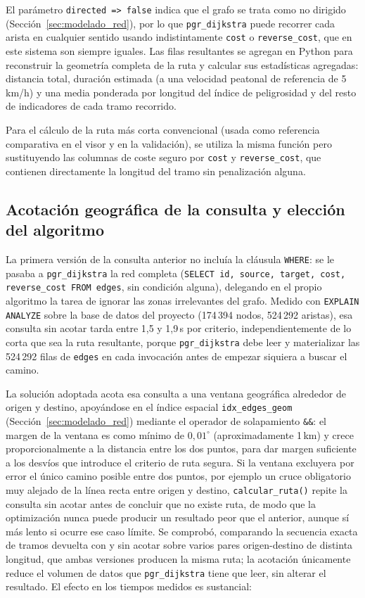 El parámetro \texttt{directed => false} indica que el grafo se trata como no dirigido (Sección~\ref{sec:modelado_red}), por lo que \texttt{pgr\_dijkstra} puede recorrer cada arista en cualquier sentido usando indistintamente \texttt{cost} o \texttt{reverse\_cost}, que en este sistema son siempre iguales. Las filas resultantes se agregan en Python para reconstruir la geometría completa de la ruta y calcular sus estadísticas agregadas: distancia total, duración estimada (a una velocidad peatonal de referencia de 5\,km/h) y una media ponderada por longitud del índice de peligrosidad y del resto de indicadores de cada tramo recorrido.

Para el cálculo de la ruta más corta convencional (usada como referencia comparativa en el visor y en la validación), se utiliza la misma función pero sustituyendo las columnas de coste seguro por \texttt{cost} y \texttt{reverse\_cost}, que contienen directamente la longitud del tramo sin penalización alguna.

\subsection{Acotación geográfica de la consulta y elección del algoritmo}
\label{subsec:optimizacion_enrutamiento}

La primera versión de la consulta anterior no incluía la cláusula \texttt{WHERE}: se le pasaba a \texttt{pgr\_dijkstra} la red completa (\texttt{SELECT id, source, target, cost, reverse\_cost FROM edges}, sin condición alguna), delegando en el propio algoritmo la tarea de ignorar las zonas irrelevantes del grafo. Medido con \texttt{EXPLAIN ANALYZE} sobre la base de datos del proyecto (174\,394 nodos, 524\,292 aristas), esa consulta sin acotar tarda entre 1,5 y 1,9\,s por criterio, independientemente de lo corta que sea la ruta resultante, porque \texttt{pgr\_dijkstra} debe leer y materializar las 524\,292 filas de \texttt{edges} en cada invocación antes de empezar siquiera a buscar el camino.

La solución adoptada acota esa consulta a una ventana geográfica alrededor de origen y destino, apoyándose en el índice espacial \texttt{idx\_edges\_geom} (Sección~\ref{sec:modelado_red}) mediante el operador de solapamiento \texttt{\&\&}: el margen de la ventana es como mínimo de $0{,}01^\circ$ (aproximadamente 1\,km) y crece proporcionalmente a la distancia entre los dos puntos, para dar margen suficiente a los desvíos que introduce el criterio de ruta segura. Si la ventana excluyera por error el único camino posible entre dos puntos, por ejemplo un cruce obligatorio muy alejado de la línea recta entre origen y destino, \texttt{calcular\_ruta()} repite la consulta sin acotar antes de concluir que no existe ruta, de modo que la optimización nunca puede producir un resultado peor que el anterior, aunque sí más lento si ocurre ese caso límite. Se comprobó, comparando la secuencia exacta de tramos devuelta con y sin acotar sobre varios pares origen-destino de distinta longitud, que ambas versiones producen la misma ruta; la acotación únicamente reduce el volumen de datos que \texttt{pgr\_dijkstra} tiene que leer, sin alterar el resultado. El efecto en los tiempos medidos es sustancial:

